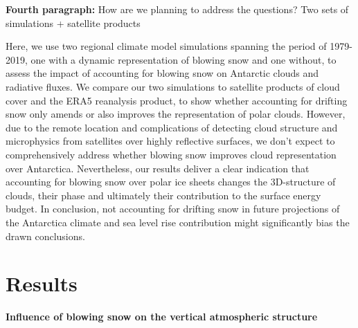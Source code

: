 \documentclass[12pt]{article}
\begin{document}
\textbf{Fourth paragraph:} How are we planning to address the questions? 
Two sets of simulations + satellite products

Here, we use two regional climate model simulations spanning the period of 1979-2019, one with a dynamic representation of blowing snow and one without, to assess the impact of accounting for blowing snow on Antarctic clouds and radiative fluxes. We compare our two simulations to satellite products of cloud cover and the ERA5 reanalysis product, to show whether accounting for drifting snow only amends or also improves the representation of polar clouds. However, due to the remote location and complications of detecting cloud structure and microphysics from satellites over highly reflective surfaces, we don’t expect to comprehensively address whether blowing snow improves cloud representation over Antarctica. Nevertheless, our results deliver a clear indication that accounting for blowing snow over polar ice sheets changes the 3D-structure of clouds, their phase and ultimately their contribution to the surface energy budget. In conclusion, not accounting for drifting snow in future projections of the Antarctica climate and sea level rise contribution might significantly bias the drawn conclusions.  

\section*{Results}


\textbf{Influence of blowing snow on the vertical atmospheric structure}
\end{document}
